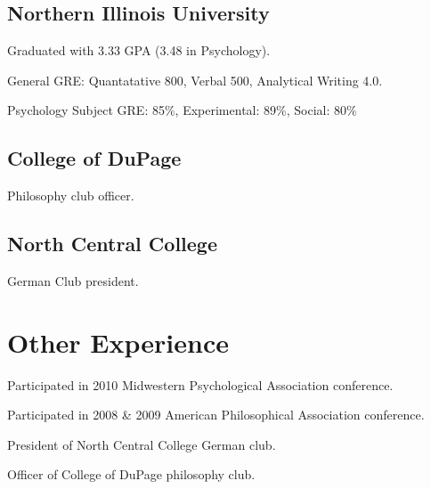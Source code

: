 \documentclass{resume}
\begin{document}
\subsection{Northern Illinois University}

\begin{compactitem}
  \item Graduated with 3.33 GPA (3.48 in Psychology).
  \item General GRE: Quantatative 800, Verbal 500, Analytical Writing 4.0.
  \item Psychology Subject GRE: 85\%, Experimental: 89\%, Social: 80\%
\end{compactitem}

\subsection{College of DuPage}
\begin{compactitem}
  \item Philosophy club officer.
\end{compactitem}

\subsection{North Central College}
\begin{compactitem}
  \item German Club president.
\end{compactitem}

\section{Other Experience}

\begin{compactitem}
  \item Participated in 2010 Midwestern Psychological Association conference.
  \item Participated in 2008 \& 2009 American Philosophical Association conference.
  \item President of North Central College German club.
  \item Officer of College of DuPage philosophy club.
\end{compactitem}
\end{document}
